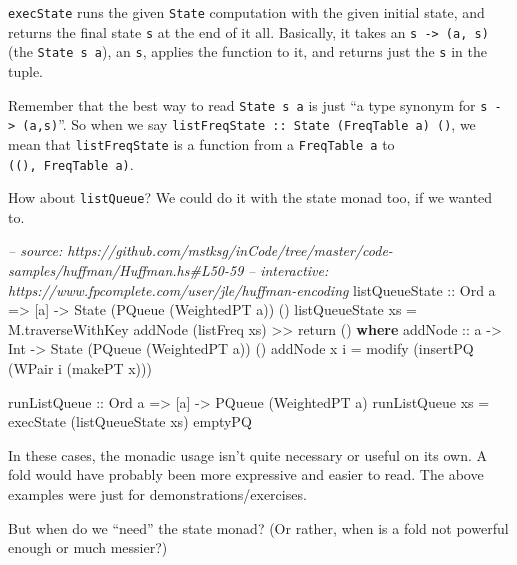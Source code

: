 \documentclass[]{article}
\newenvironment{Shaded}{\begin{snugshade}}{\end{snugshade}}
\newcommand{\CommentTok}[1]{\textcolor[rgb]{0.56,0.35,0.01}{\textit{#1}}}
\newcommand{\DataTypeTok}[1]{\textcolor[rgb]{0.13,0.29,0.53}{#1}}
\newcommand{\FunctionTok}[1]{\textcolor[rgb]{0.00,0.00,0.00}{#1}}
\newcommand{\KeywordTok}[1]{\textcolor[rgb]{0.13,0.29,0.53}{\textbf{#1}}}
\newcommand{\NormalTok}[1]{#1}
\newcommand{\OtherTok}[1]{\textcolor[rgb]{0.56,0.35,0.01}{#1}}
\begin{document}
\texttt{execState} runs the given \texttt{State} computation with the given
initial state, and returns the final state \texttt{s} at the end of it all.
Basically, it takes an \texttt{s\ -\textgreater{}\ (a,\ s)} (the
\texttt{State\ s\ a}), an \texttt{s}, applies the function to it, and returns
just the \texttt{s} in the tuple.

Remember that the best way to read \texttt{State\ s\ a} is just ``a type synonym
for \texttt{s\ -\textgreater{}\ (a,s)}''. So when we say
\texttt{listFreqState\ ::\ State\ (FreqTable\ a)\ ()}, we mean that
\texttt{listFreqState} is a function from a \texttt{FreqTable\ a} to
\texttt{((),\ FreqTable\ a)}.

How about \texttt{listQueue}? We could do it with the state monad too, if we
wanted to.

\begin{Shaded}
\begin{Highlighting}[]
\CommentTok{-- source: https://github.com/mstksg/inCode/tree/master/code-samples/huffman/Huffman.hs#L50-59}
\CommentTok{-- interactive: https://www.fpcomplete.com/user/jle/huffman-encoding}
\OtherTok{listQueueState ::} \DataTypeTok{Ord}\NormalTok{ a }\OtherTok{=>}\NormalTok{ [a] }\OtherTok{->} \DataTypeTok{State}\NormalTok{ (}\DataTypeTok{PQueue}\NormalTok{ (}\DataTypeTok{WeightedPT}\NormalTok{ a)) ()}
\NormalTok{listQueueState xs }\FunctionTok{=}\NormalTok{ M.traverseWithKey addNode (listFreq xs) }\FunctionTok{>>}\NormalTok{ return ()}
  \KeywordTok{where}
\OtherTok{    addNode ::}\NormalTok{ a }\OtherTok{->} \DataTypeTok{Int} \OtherTok{->} \DataTypeTok{State}\NormalTok{ (}\DataTypeTok{PQueue}\NormalTok{ (}\DataTypeTok{WeightedPT}\NormalTok{ a)) ()}
\NormalTok{    addNode x i }\FunctionTok{=}\NormalTok{ modify (insertPQ (}\DataTypeTok{WPair}\NormalTok{ i (makePT x)))}

\OtherTok{runListQueue ::} \DataTypeTok{Ord}\NormalTok{ a }\OtherTok{=>}\NormalTok{ [a] }\OtherTok{->} \DataTypeTok{PQueue}\NormalTok{ (}\DataTypeTok{WeightedPT}\NormalTok{ a)}
\NormalTok{runListQueue xs }\FunctionTok{=}\NormalTok{ execState (listQueueState xs) emptyPQ}
\end{Highlighting}
\end{Shaded}

In these cases, the monadic usage isn't quite necessary or useful on its own. A
fold would have probably been more expressive and easier to read. The above
examples were just for demonstrations/exercises.

But when do we ``need'' the state monad? (Or rather, when is a fold not powerful
enough or much messier?)
\end{document}
